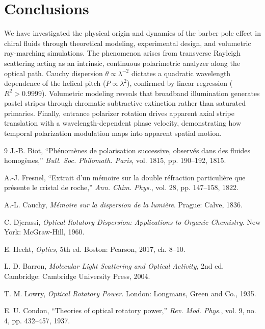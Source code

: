 \documentclass[twocolumn,10pt,a4paper]{article}
\begin{document}
\section{Conclusions}

We have investigated the physical origin and dynamics of the barber pole effect in chiral fluids through theoretical modeling, experimental design, and volumetric ray-marching simulations. The phenomenon arises from transverse Rayleigh scattering acting as an intrinsic, continuous polarimetric analyzer along the optical path. Cauchy dispersion $\theta \propto \lambda^{-2}$ dictates a quadratic wavelength dependence of the helical pitch ($P \propto \lambda^2$), confirmed by linear regression ($R^2 > 0.9999$). Volumetric modeling reveals that broadband illumination generates pastel stripes through chromatic subtractive extinction rather than saturated primaries. Finally, entrance polarizer rotation drives apparent axial stripe translation with a wavelength-dependent phase velocity, demonstrating how temporal polarization modulation maps into apparent spatial motion.

\begin{thebibliography}{9}
\footnotesize
\setlength{\itemsep}{0pt}
\setlength{\parskip}{0pt}
J.-B. Biot, ``Phénomènes de polarisation successive, observés dans des fluides homogènes,'' \textit{Bull. Soc. Philomath. Paris}, vol. 1815, pp. 190--192, 1815.

A.-J. Fresnel, ``Extrait d'un mémoire sur la double réfraction particulière que présente le cristal de roche,'' \textit{Ann. Chim. Phys.}, vol. 28, pp. 147--158, 1822.

A.-L. Cauchy, \textit{Mémoire sur la dispersion de la lumière}. Prague: Calve, 1836.

C. Djerassi, \textit{Optical Rotatory Dispersion: Applications to Organic Chemistry}. New York: McGraw-Hill, 1960.

E. Hecht, \textit{Optics}, 5th ed. Boston: Pearson, 2017, ch. 8--10.

L. D. Barron, \textit{Molecular Light Scattering and Optical Activity}, 2nd ed. Cambridge: Cambridge University Press, 2004.

T. M. Lowry, \textit{Optical Rotatory Power}. London: Longmans, Green and Co., 1935.

E. U. Condon, ``Theories of optical rotatory power,'' \textit{Rev. Mod. Phys.}, vol. 9, no. 4, pp. 432--457, 1937.
\end{thebibliography}
\end{document}

